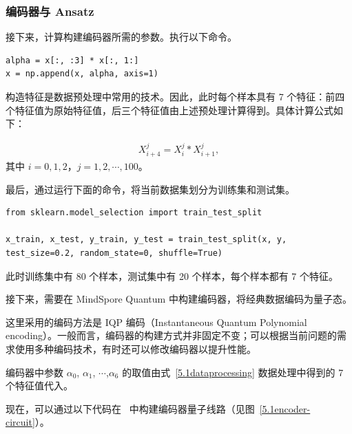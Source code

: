 

\subsubsection{编码器与 Ansatz}
接下来，计算构建编码器所需的参数。执行以下命令。

\begin{lstlisting}
alpha = x[:, :3] * x[:, 1:]
x = np.append(x, alpha, axis=1)
\end{lstlisting}

构造特征是数据预处理中常用的技术。因此，此时每个样本具有 7 个特征：前四个特征值为原始特征值，后三个特征值由上述预处理计算得到。具体计算公式如下：

\begin{eqnarray}\label{5.1dataprocessing}
    X_{i+4}^{j} = X_{i}^{j} * X_{i+1}^{j},
\end{eqnarray}
其中 $i = 0, 1, 2$，$j = 1, 2, \cdots, 100$。

最后，通过运行下面的命令，将当前数据集划分为训练集和测试集。

\begin{lstlisting}
from sklearn.model_selection import train_test_split

x_train, x_test, y_train, y_test = train_test_split(x, y, test_size=0.2, random_state=0, shuffle=True)
\end{lstlisting}

此时训练集中有 80 个样本，测试集中有 20 个样本，每个样本都有 7 个特征。

接下来，需要在 MindSpore Quantum 中构建编码器，将经典数据编码为量子态。

这里采用的编码方法是 IQP 编码（Instantaneous Quantum Polynomial encoding）。一般而言，编码器的构建方式并非固定不变；可以根据当前问题的需求使用多种编码技术，有时还可以修改编码器以提升性能。

编码器中参数 $\alpha_0$, $\alpha_1$, $\cdots$,$\alpha_6$ 的取值由式~\eqref{5.1dataprocessing} 数据处理中得到的 7 个特征值代入。

现在，可以通过以下代码在 \MindQuantum\ 中构建编码器量子线路（见图~\ref{5.1encoder-circuit}）。

